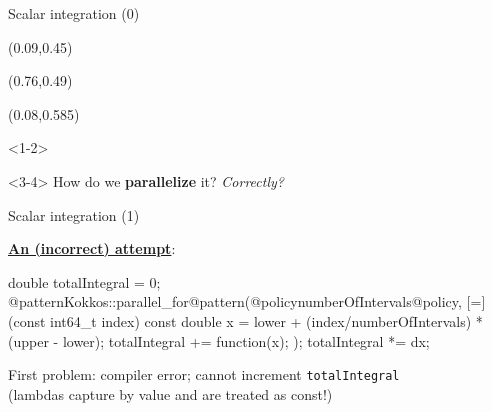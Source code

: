 \begin{frame}[fragile]{Scalar integration (0)}
\begin{onlyenv}
  \begin{textblock*}{0.5\textwidth}(0.09\textwidth,0.45\textheight)
  \end{textblock*}

  \begin{textblock*}{0.5\textwidth}(0.76\textwidth,0.49\textheight)
  \end{textblock*}

  \begin{textblock*}{0.5\textwidth}(0.08\textwidth,0.585\textheight)
  \end{textblock*}
  \pause
  \vspace{10pt}

  \end{onlyenv}

  \begin{onlyenv}<1-2>
    \vspace{10pt}
  \end{onlyenv}

  \begin{onlyenv}<3-4>
  How do we \textbf{parallelize} it?  \textit{Correctly?}
  \end{onlyenv}

\end{frame}


\begin{frame}[fragile]{Scalar integration (1)}

  \textbf{\ul{An (incorrect) attempt}}:

  \vspace{5pt}

  \begin{code}[linebackgroundcolor={
        \btLstHL<1->{4-6}{bodyColor}
      },
      frame=single
    ]
double totalIntegral = 0;
@patternKokkos::parallel_for@pattern(@policynumberOfIntervals@policy,
  [=] (const int64_t index) {
    const double x =
      lower + (index/numberOfIntervals) * (upper - lower);
    totalIntegral += function(x);}
  );
totalIntegral *= dx;
  \end{code}

\vspace{15pt}

{\color{red}First problem}: compiler error; cannot increment \texttt{totalIntegral} \\
  \hspace{20pt}(lambdas capture by value and are treated as const!)

\end{frame}

